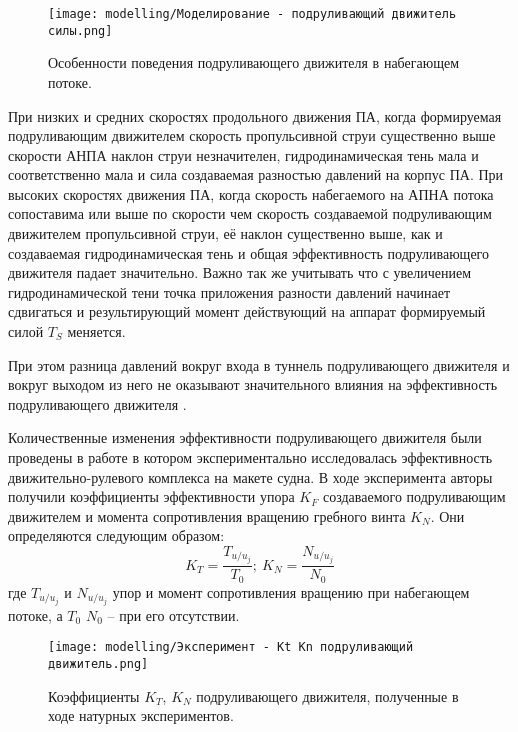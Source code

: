 \begin{figure}[ht]
    \centering
    \texttt{[image: modelling/Моделирование - подруливающий движитель силы.png]}
    \caption{Особенности поведения подруливающего движителя в набегающем потоке.}
    \label{fig:modelling-tunnel}
\end{figure}

При низких и средних скоростях продольного движения ПА, когда формируемая подруливающим движителем скорость пропульсивной струи существенно выше скорости АНПА наклон струи незначителен, гидродинамическая тень мала и соответственно мала и сила создаваемая разностью давлений на корпус ПА.
При высоких скоростях движения ПА, когда скорость набегаемого на АПНА потока сопоставима или выше по скорости чем скорость создаваемой подруливающим движителем пропульсивной струи, её наклон существенно выше, как и создаваемая гидродинамическая тень и общая эффективность подруливающего движителя падает значительно.
Важно так же учитывать что с увеличением гидродинамической тени точка приложения разности давлений начинает сдвигаться и результирующий момент действующий на аппарат формируемый силой $T_S$ меняется.

При этом разница давлений вокруг входа в туннель подруливающего движителя и вокруг выходом из него не оказывают значительного влияния на эффективность подруливающего движителя \cite{brix1973lateral}.

Количественные изменения эффективности подруливающего движителя были проведены в работе \cite{chislett1966influence} в котором экспериментально исследовалась эффективность движительно-рулевого комплекса на макете судна.
В ходе эксперимента авторы получили коэффициенты эффективности упора $K_F$ создаваемого подруливающим движителем и момента сопротивления вращению гребного винта $K_N$.
Они определяются следующим образом:
\begin{equation*}
	K_T = \frac{T_{u/u_j}}{T_0}; \: K_N = \frac{N_{u/u_j}}{N_0}
\end{equation*}
\noindent где $T_{u/u_j}$ и $N_{u/u_j}$ упор и момент сопротивления вращению при набегающем потоке, а $T_0$ $N_0$ -- при его отсутствии.

\begin{figure}[ht]
    \centering
    \texttt{[image: modelling/Эксперимент - Kt Kn подруливающий движитель.png]}
    \caption{Коэффициенты $K_T$, $K_N$ подруливающего движителя, полученные в ходе натурных экспериментов.}
    \label{fig:tunnel_effectivness}
\end{figure}

